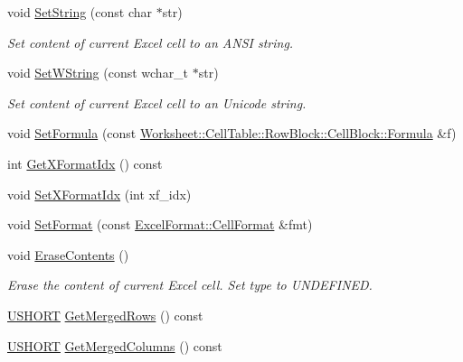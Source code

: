 \begin{DoxyCompactItemize}
void \hyperlink{class_y_excel_1_1_basic_excel_cell_ae8da861167bf5d90eb6234c43e977ddc}{Set\+String} (const char $\ast$str)
\begin{DoxyCompactList}\small\item\em Set content of current Excel cell to an A\+N\+S\+I string. \end{DoxyCompactList}\item 
void \hyperlink{class_y_excel_1_1_basic_excel_cell_aee14ddca30b02a3660cbef4699520e11}{Set\+W\+String} (const wchar\+\_\+t $\ast$str)
\begin{DoxyCompactList}\small\item\em Set content of current Excel cell to an Unicode string. \end{DoxyCompactList}\item 
void \hyperlink{class_y_excel_1_1_basic_excel_cell_adf44468200e0744b0da06f2cc1e11712}{Set\+Formula} (const \hyperlink{struct_y_excel_1_1_worksheet_1_1_cell_table_1_1_row_block_1_1_cell_block_1_1_formula}{Worksheet\+::\+Cell\+Table\+::\+Row\+Block\+::\+Cell\+Block\+::\+Formula} \&f)
\item 
int \hyperlink{class_y_excel_1_1_basic_excel_cell_ae91320d5925679253e0313c7dee50949}{Get\+X\+Format\+Idx} () const 
\item 
void \hyperlink{class_y_excel_1_1_basic_excel_cell_aabca84f7f814a484496309655531be5f}{Set\+X\+Format\+Idx} (int xf\+\_\+idx)
\item 
void \hyperlink{class_y_excel_1_1_basic_excel_cell_a9dc8501a02d9ce25bfb9267d1683634f}{Set\+Format} (const \hyperlink{struct_excel_format_1_1_cell_format}{Excel\+Format\+::\+Cell\+Format} \&fmt)
\item 
void \hyperlink{class_y_excel_1_1_basic_excel_cell_aa37fb3b619162e28b49368a2a9bbbfd7}{Erase\+Contents} ()
\begin{DoxyCompactList}\small\item\em Erase the content of current Excel cell. Set type to U\+N\+D\+E\+F\+I\+N\+E\+D. \end{DoxyCompactList}\item 
\hyperlink{_basic_excel_8hpp_a5850d5316caf7f4cedd742fdf8cd7c02}{U\+S\+H\+O\+R\+T} \hyperlink{class_y_excel_1_1_basic_excel_cell_a51fbd578f7201dc5eb00cb3cac0c803e}{Get\+Merged\+Rows} () const 
\item 
\hyperlink{_basic_excel_8hpp_a5850d5316caf7f4cedd742fdf8cd7c02}{U\+S\+H\+O\+R\+T} \hyperlink{class_y_excel_1_1_basic_excel_cell_a478284e685e6540df048ab2c3b8b9b0e}{Get\+Merged\+Columns} () const 
\item 

\end{DoxyCompactItemize}
